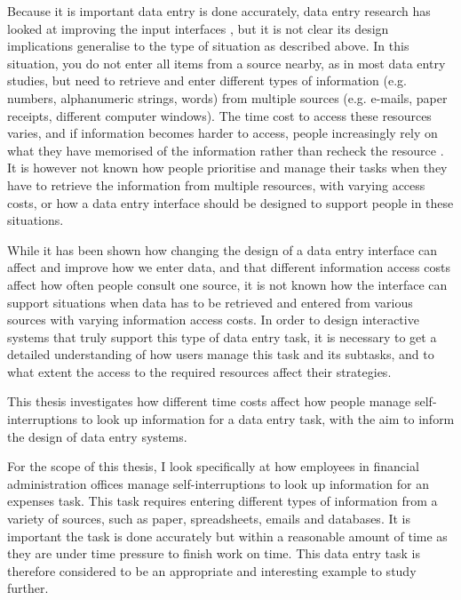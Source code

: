 Because it is important data entry is done accurately, data entry research has looked at improving the input interfaces \citep[e.g.][]{Oladimeji2013, Vertanen2015, Wiseman2013a}, but it is not clear its design implications generalise to the type of situation as described above. In this situation, you do not enter all items from a source nearby, as in most data entry studies, but need to retrieve and enter different types of information (e.g. numbers, alphanumeric strings, words) from multiple sources (e.g. e-mails, paper receipts, different computer windows). The time cost to access these resources varies, and if information becomes harder to access, people increasingly rely on what they have memorised of the information rather than recheck the resource \citep{Gray2006}. It is however not known how people prioritise and manage their tasks when they have to retrieve the information from multiple resources, with varying access costs, or how a data entry interface should be designed to support people in these situations. 

While it has been shown how changing the design of a data entry interface can affect and improve how we enter data, and that different information access costs affect how often people consult one source, it is not known how the interface can support situations when data has to be retrieved and entered from various sources with varying information access costs. In order to design interactive systems that truly support this type of data entry task, it is necessary to get a detailed understanding of how users manage this task and its subtasks, and to what extent the access to the required resources affect their strategies.

This thesis investigates how different time costs affect how people manage self-interruptions to look up information for a data entry task, with the aim to inform the design of data entry systems. 

For the scope of this thesis, I look specifically at how employees in financial administration offices manage self-interruptions to look up information for an expenses task. This task requires entering different types of information from a variety of sources, such as paper, spreadsheets, emails and databases. It is important the task is done accurately but within a reasonable amount of time as they are under time pressure to finish work on time. This data entry task is therefore considered to be an appropriate and interesting example to study further. 


